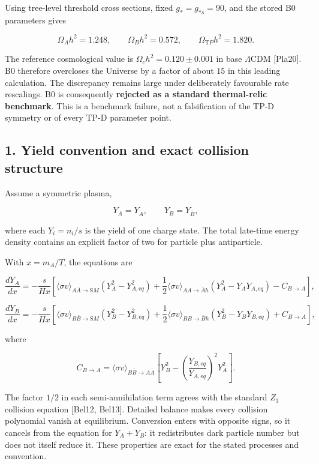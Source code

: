 \documentclass[
]{article}
\begin{document}
Using tree-level threshold cross sections, fixed \(g_*=g_{*s}=90\), and
the stored B0 parameters gives

\[
\Omega_Ah^2=1.248,\qquad
\Omega_Bh^2=0.572,\qquad
\boxed{\Omega_{\mathrm TP}h^2=1.820}.
\]

The reference cosmological value is \(\Omega_ch^2=0.120\pm0.001\) in
base \(\Lambda\)CDM {[}Pla20{]}. B0 therefore overcloses the Universe by
a factor of about \(15\) in this leading calculation. The discrepancy
remains large under deliberately favourable rate rescalings. B0 is
consequently \textbf{rejected as a standard thermal-relic benchmark}.
This is a benchmark failure, not a falsification of the TP-D symmetry or
of every TP-D parameter point.

\hypertarget{yield-convention-and-exact-collision-structure}{%
\subsection{1. Yield convention and exact collision
structure}\label{yield-convention-and-exact-collision-structure}}

Assume a symmetric plasma,

\[
Y_A=Y_{\bar A},\qquad Y_B=Y_{\bar B},
\]

where each \(Y_i=n_i/s\) is the yield of one charge state. The total
late-time energy density contains an explicit factor of two for particle
plus antiparticle.

With \(x=m_A/T\), the equations are

\[
\frac{dY_A}{dx}=-\frac{s}{Hx}\left[
\langle\sigma v\rangle_{A\bar A\to {\mathrm SM}}(Y_A^2-Y_{A,{\mathrm eq}}^2)
+\frac12\langle\sigma v\rangle_{AA\to\bar Ah}
(Y_A^2-Y_AY_{A,{\mathrm eq}})-C_{B\to A}
\right],
\]

\[
\frac{dY_B}{dx}=-\frac{s}{Hx}\left[
\langle\sigma v\rangle_{B\bar B\to {\mathrm SM}}(Y_B^2-Y_{B,{\mathrm eq}}^2)
+\frac12\langle\sigma v\rangle_{BB\to\bar Bh}
(Y_B^2-Y_BY_{B,{\mathrm eq}})+C_{B\to A}
\right],
\]

where

\[
C_{B\to A}=\langle\sigma v\rangle_{B\bar B\to A\bar A}
\left[Y_B^2-
\left(\frac{Y_{B,{\mathrm eq}}}{Y_{A,{\mathrm eq}}}\right)^2Y_A^2\right].
\]

The factor \(1/2\) in each semi-annihilation term agrees with the
standard \(Z_3\) collision equation {[}Bel12, Bel13{]}. Detailed balance
makes every collision polynomial vanish at equilibrium. Conversion
enters with opposite signs, so it cancels from the equation for
\(Y_A+Y_B\): it redistributes dark particle number but does not itself
reduce it. These properties are exact for the stated processes and
convention.
\end{document}

